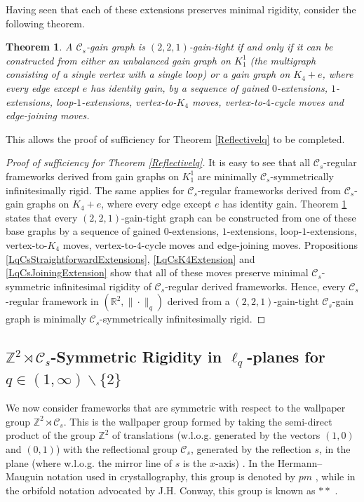 \documentclass[reqno,a4paper,10pt]{article}
\newtheorem{theorem}{Theorem}[section]
\theoremstyle{definition}
\theoremstyle{remark}
\numberwithin{equation}{section}
\numberwithin{figure}{section}
\numberwithin{table}{section}
\newcommand{\R}{\mathbb{R}}
\newcommand{\Z}{\mathbb{Z}}
\begin{document}
    Having seen that each of these extensions preserves minimal rigidity, consider the following theorem.
	\begin{theorem}\label{Induction221}\cite[Theorem 17]{Surfaces}
		A $\mathcal{C}_s$-gain graph is $(2,2,1)$-gain-tight if and only if it can be constructed from either an unbalanced gain graph on $K_1^1$ (the multigraph consisting of a single vertex with a single loop)  or a gain graph on $K_4+e$, where every edge except $e$ has identity gain, by a sequence of gained $0$-extensions, $1$-extensions, loop-$1$-extensions, vertex-to-$K_4$ moves, vertex-to-$4$-cycle moves and edge-joining moves.
	\end{theorem}
    This allows the proof of sufficiency for Theorem \ref{Reflectivelq} to be completed.
	\begin{proof}[Proof of sufficiency for Theorem \ref{Reflectivelq}]
		It is easy to see that all $\mathcal{C}_s$-regular frameworks derived from gain graphs on $K_1^1$ are minimally $\mathcal{C}_s$-symmetrically infinitesimally rigid. The same applies for $\mathcal{C}_s$-regular frameworks derived from $\mathcal{C}_s$-gain graphs on $K_4+e$, where every edge except $e$ has identity gain. Theorem \ref{Induction221} states that every $(2,2,1)$-gain-tight graph can be constructed from one of these base graphs by a sequence of gained $0$-extensions, $1$-extensions, loop-$1$-extensions, vertex-to-$K_4$ moves, vertex-to-$4$-cycle moves and edge-joining moves. Propositions \ref{LqCsStraightforwardExtensions}, \ref{LqCsK4Extension} and \ref{LqCsJoiningExtension} show that all of these moves preserve minimal $\mathcal{C}_s$-symmetric infinitesimal rigidity of $\mathcal{C}_s$-regular derived frameworks. Hence, every $\mathcal{C}_s$-regular framework in $(\R^2,\|\cdot\|_q)$ derived from a $(2,2,1)$-gain-tight $\mathcal{C}_s$-gain graph is minimally $\mathcal{C}_s$-symmetrically infinitesimally rigid.
	\end{proof}

    \subsection{$\Z^2\rtimes\mathcal{C}_s$-Symmetric Rigidity in $\ell_q$-planes for $q\in(1,\infty)\backslash\{2\}$}\label{SectionLqWallpaper}
    We now consider frameworks that are symmetric with respect to the wallpaper group $\Z^2\rtimes\mathcal{C}_s$. This is the wallpaper group formed by taking the semi-direct product of the group $\Z^2$ of translations (w.l.o.g. generated by the vectors $(1,0)$ and $(0,1)$) with the reflectional group $\mathcal{C}_s$, generated by the reflection $s$, in the plane (where w.l.o.g. the mirror line of $s$ is the $x$-axis) \cite[Section 3.2]{Gocg}. In the Hermann–Mauguin notation used in crystallography, this group is  denoted by $pm$ \cite{Schatt, HMbook}, while in the orbifold notation advocated by J.H. Conway, this group is known as $\ast\ast$ \cite{Sym}.
    
\end{document}
